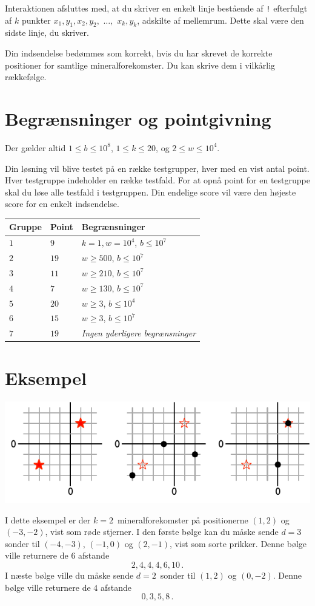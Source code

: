 Interaktionen afsluttes med, at du skriver en enkelt linje bestående af \texttt{!} efterfulgt af $k$ punkter $x_1, y_1, x_2, y_2,$ $\ldots,$ $x_k, y_k$, adskilte af mellemrum.
Dette skal være den sidste linje, du skriver.

Din indsendelse bedømmes som korrekt, hvis du har skrevet de korrekte positioner for samtlige mineralforekomster.
Du kan skrive dem i vilkårlig rækkefølge.


\section*{Begrænsninger  og pointgivning}

Der gælder altid
$1\leq b \leq 10^8$, %
$1 \leq k \leq 20$, %
og
$2 \le w \leq 10^4$. %

Din løsning vil blive testet på en række testgrupper, hver med en vist antal point.
Hver testgruppe indeholder en række testfald.
For at opnå point for en testgruppe skal du løse alle testfald i testgruppen.
Din endelige score vil være den højeste score for en enkelt indsendelse.

\medskip
\begin{tabular}{lll}
Gruppe & Point & Begrænsninger \\\hline
$1$ & $9$ & $k = 1, w = 10^4$, $b \le 10^7$\\
$2$ & $19$ & $w \ge 500$, $b \le 10^7$\\
$3$ & $11$ & $w \ge 210$, $b \le 10^7$\\
$4$ & $7$ & $w \ge 130$, $b \le 10^7$\\
$5$ & $20$ & $w \ge 3$, $b \le 10^4$\\
$6$ & $15$ & $w \ge 3$, $b \le 10^7$\\
$7$ & $19$ & \emph{Ingen yderligere begrænsninger}
\end{tabular}

\section*{Eksempel}

\includegraphics[width=.6\textwidth]{img/sample1.pdf}

I dette eksempel er der $k=2$~mineralforekomster på positionerne $(1,2)$ og $(-3,-2)$, vist som røde stjerner.
I den første bølge kan du måske sende $d=3$ sonder til $(-4,-3)$, $(-1, 0)$ og $(2,-1)$, vist som sorte prikker.
Denne bølge ville returnere de $6$ afstande \[
  2, 4, 4, 4, 6, 10\,.
\]
I næste bølge ville du måske sende $d=2$~sonder til $(1,2)$ og $(0,-2)$.
Denne bølge ville returnere de $4$ afstande
\[
  0, 3, 5, 8\,.
\]
